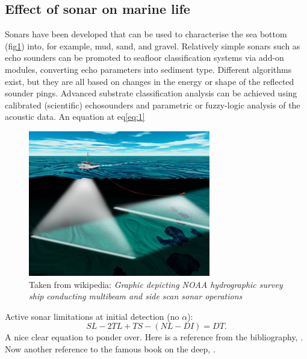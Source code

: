 \documentclass[12pt]{article}
\begin{document}
\subsection{Effect of sonar on marine life}
Sonars have been developed that can be used to characterise the sea bottom (fig\ref{fig:sample2}) into, for example, mud, sand, and gravel. Relatively simple sonars such as echo sounders can be promoted to seafloor classification systems via add-on modules, converting echo parameters into sediment type. Different algorithms exist, but they are all based on changes in the energy or shape of the reflected sounder pings. Advanced substrate classification analysis can be achieved using calibrated (scientific) echosounders and parametric or fuzzy-logic analysis of the acoustic data. An equation at eq\ref{eq:1}
\begin{figure}
\includegraphics[scale=0.4]{pics/seabedWikiPic}
\caption{\label{fig:sample2}Taken from wikipedia: \emph{Graphic depicting NOAA hydrographic survey ship conducting multibeam and side scan sonar operations}}
\end{figure}

Active sonar limitations at initial detection (no $\alpha$):
\begin{equation}
  \label{eq:1}
SL - 2TL + TS - (NL-DI) = DT.
\end{equation}
A nice clear equation to ponder over. Here is a reference from the bibliography, \cite{gortney2010department}.
Now another reference to the famous book on the deep, \cite{cousteau1953silent}.


 
\end{document}
